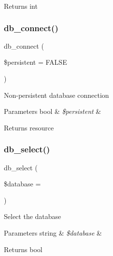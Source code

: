 \begin{DoxyReturn}{Returns}
int 
\end{DoxyReturn}
\mbox{\label{class_c_i___d_b__mssql__driver_a52bf595e79e96cc0a7c907a9b45aeb4d}} 
\subsubsection{\texorpdfstring{db\+\_\+connect()}{db\_connect()}}
{\footnotesize\ttfamily db\+\_\+connect (\begin{DoxyParamCaption}\item[{}]{\$persistent = {\ttfamily FALSE} }\end{DoxyParamCaption})}

Non-\/persistent database connection


\begin{DoxyParams}[1]{Parameters}
bool & {\em \$persistent} & \\
\hline
\end{DoxyParams}
\begin{DoxyReturn}{Returns}
resource 
\end{DoxyReturn}
\mbox{\label{class_c_i___d_b__mssql__driver_a18ae9c21870b30b45337c5e3626190cc}} 
\subsubsection{\texorpdfstring{db\+\_\+select()}{db\_select()}}
{\footnotesize\ttfamily db\+\_\+select (\begin{DoxyParamCaption}\item[{}]{\$database = {\ttfamily \textquotesingle{}\textquotesingle{}} }\end{DoxyParamCaption})}

Select the database


\begin{DoxyParams}[1]{Parameters}
string & {\em \$database} & \\
\hline
\end{DoxyParams}
\begin{DoxyReturn}{Returns}
bool 
\end{DoxyReturn}
\mbox{\label{class_c_i___d_b__mssql__driver_a43b8d30b879d4f09ceb059b02af2bc02}} 
